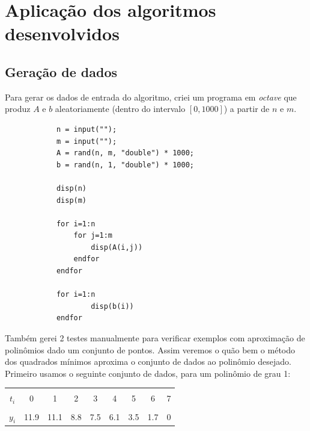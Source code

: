\documentclass[a4paper,11pt]{article}
\begin{document}
\section{Aplicação dos algoritmos desenvolvidos}
    \subsection{Geração de dados}
        Para gerar os dados de entrada do algoritmo, criei um programa em \textit{octave} que produz $A$ e $b$ aleatoriamente (dentro do intervalo $[0,1000]$) a partir de $n$ e $m$. 
        \begin{lstlisting}
            n = input("");
            m = input("");
            A = rand(n, m, "double") * 1000;
            b = rand(n, 1, "double") * 1000;
            
            disp(n)
            disp(m)
            
            for i=1:n
                for j=1:m
                    disp(A(i,j))
                endfor
            endfor
            
            for i=1:n
                    disp(b(i))
            endfor
        \end{lstlisting}
        
        Também gerei 2 testes manualmente para verificar exemplos com aproximação de polinômios dado um conjunto de pontos. Assim veremos o quão bem o método dos quadrados mínimos aproxima o conjunto de dados ao polinômio desejado. Primeiro usamos o seguinte conjunto de dados, para um polinômio de grau 1:
        \begin{center}
            \begin{tabular}{ | c || c | c | c | c | c | c | c | c | } 
                \hline
                & & & & & & & & \\ [-1em]
                $t_i$ & 0 & 1 & 2 & 3 & 4 & 5 & 6 & 7 \\  [+.5em]
                \hline
                & & & & & & & & \\ [-1em]
                $y_i$ & 11.9 & 11.1 & 8.8 & 7.5 & 6.1 & 3.5 & 1.7 & 0 \\ [+.5em]
                \hline
            \end{tabular}
        \end{center}
        
\end{document}

